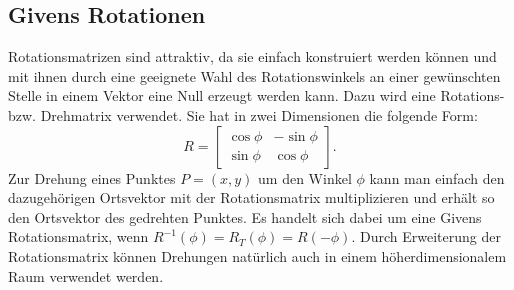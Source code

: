 \subsection{Givens Rotationen\label{francis:section:grundlagen:givens}}
Rotationsmatrizen sind attraktiv, da sie einfach konstruiert werden können und mit ihnen durch eine geeignete Wahl des Rotationswinkels an einer gewünschten Stelle in einem Vektor eine Null erzeugt werden kann.
Dazu wird eine Rotations- bzw. Drehmatrix verwendet.
Sie hat in zwei Dimensionen die folgende Form:
\begin{equation}
	R=\begin{bmatrix}
	\cos\phi & -\sin\phi \\
	\sin\phi & \cos\phi
	\end{bmatrix}.
\end{equation}
Zur Drehung eines Punktes $P=(x,y)$ um den Winkel $\phi$ kann man einfach den dazugehörigen Ortsvektor mit der Rotationsmatrix multiplizieren und erhält so den Ortsvektor des gedrehten Punktes.
Es handelt sich dabei um eine Givens Rotationsmatrix, wenn $R^{-1}(\phi)=R_{T}(\phi)=R(-\phi)$.
Durch Erweiterung der Rotationsmatrix können Drehungen natürlich auch in einem höherdimensionalem Raum verwendet werden.


